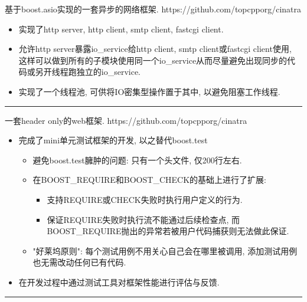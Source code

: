 \documentclass[UTF8]{resume}
\newcommand{\subsectionrule}{{\vspace{-8pt}\hspace{0.5cm}\rule[1pt]{\linewidth-1cm}{0.05pt}\vspace{-8pt}}}
\begin{document}
\begin{onehalfspacing}
基于boost.asio实现的一套异步的网络框架.
\newline
https://github.com/topcpporg/cinatra
\begin{itemize}
  \item 实现了http server, http client, smtp client, fastcgi client.
  \item 允许http server暴露io\_service给http client, smtp client或fastcgi client使用, 这样可以做到所有的子模块使用同一个io\_service从而尽量避免出现同步的代码或另开线程跑独立的io\_service.
  \item 实现了一个线程池, 可供将IO密集型操作置于其中, 以避免阻塞工作线程.
\end{itemize}
\end{onehalfspacing}

\subsectionrule

\begin{onehalfspacing}
一套header only的web框架. 
\newline
https://github.com/topcpporg/cinatra
\begin{itemize}
  \item 完成了mini单元测试框架的开发, 以之替代boost.test
  \begin{itemize}
    \item 避免boost.test臃肿的问题: 只有一个头文件, 仅200行左右.
    \item 在BOOST\_REQUIRE和BOOST\_CHECK的基础上进行了扩展: 
    \begin{itemize}
        \item 支持REQUIRE或CHECK失败时执行用户定义的行为.
        \item 保证REQUIRE失败时执行流不能通过后续检查点, 而BOOST\_REQUIRE抛出的异常若被用户代码捕获则无法做此保证.
    \end{itemize}
    \item "好莱坞原则": 每个测试用例不用关心自己会在哪里被调用, 添加测试用例也无需改动任何已有代码.
  \end{itemize}
  \item 在开发过程中通过测试工具对框架性能进行评估与反馈.
\end{itemize}
\end{onehalfspacing}

\subsectionrule
\end{document}
